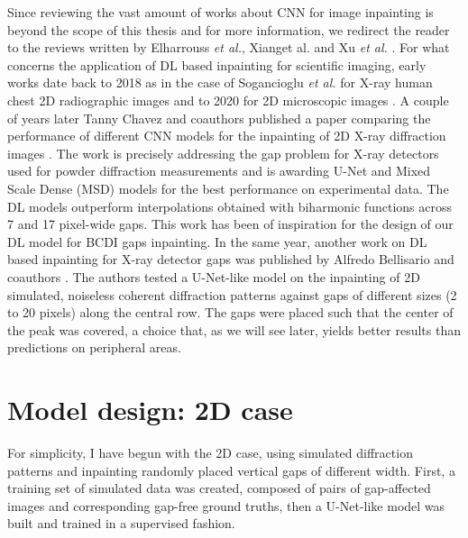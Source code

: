 Since reviewing the vast amount of works about CNN for image inpainting is beyond the scope of this thesis and for more 
information, we redirect the reader to the reviews written by Elharrouss \textit{et al.}, Xiang{et al.} and  Xu 
\textit{et al.} \cite{reviewInpainting2021,DL_InpaintingReveiw2023_0, reviewInpaintingDL2023}. For what concerns the application of DL based 
inpainting for scientific imaging, early works date back to 2018 as in the case of Sogancioglu \textit{et al.} for X-ray 
human chest 2D radiographic images \cite{sogancioglu2018chestxrayinpaintingdeep} and to 2020 for 2D microscopic images \cite{microscopic_inpainting_2020}.
A couple of years later Tanny Chavez and coauthors published a paper comparing the performance of different CNN models 
for the inpainting of 2D X-ray diffraction images \cite{chavez_comparison_2022}. The work is precisely addressing the 
gap problem for X-ray detectors used for powder diffraction measurements and is awarding U-Net and Mixed Scale Dense (MSD) 
models for the best performance on experimental data. The DL models outperform interpolations obtained with biharmonic functions
across 7 and 17 pixel-wide gaps. This work has been of inspiration for the design of our DL model for BCDI gaps inpainting.
In the same year, another work on DL based inpainting for X-ray detector gaps was published by Alfredo Bellisario 
and coauthors \cite{bellisario_noise_2022}. The authors tested a U-Net-like model on the inpainting of 2D simulated, noiseless
coherent diffraction patterns against gaps of different sizes (2 to 20 pixels) along the central row. The gaps were 
placed such that the center of the peak was covered, a choice that, as we will see later, yields better results than 
predictions on peripheral areas. \\


\section{Model design: 2D case}\label{sec:model}

For simplicity, I have begun with the 2D case, using simulated diffraction patterns and inpainting randomly placed 
vertical gaps of different width. First, a training set of simulated data was created, composed of pairs of gap-affected 
images and corresponding gap-free ground truths, then a U-Net-like model was built and trained in a supervised fashion.

